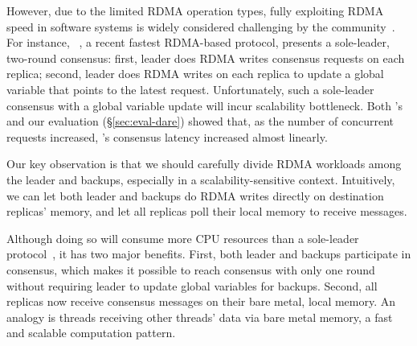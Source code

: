 However, due to the limited RDMA operation types, fully exploiting RDMA
speed in software systems is widely considered 
challenging by the community~\cite{pilaf:usenix14,herd:sigcomm14,
farm:sosp15,dare:hpdc15}. For instance, \dare~\cite{dare:hpdc15}, a recent 
fastest RDMA-based \paxos protocol, presents a sole-leader, two-round 
consensus: first, leader does RDMA writes consensus requests on each replica; 
second, leader does RDMA writes on each replica to update a global variable 
that points to the latest request. Unfortunately, such a sole-leader consensus 
with a global variable update will incur scalability bottleneck. Both \dare's 
and our evaluation (\S\ref{sec:eval-dare}) showed that, as the number of 
concurrent requests increased, \dare's consensus latency increased almost 
linearly.




Our key observation is that we should carefully divide RDMA workloads among
the leader and backups, especially in a scalability-sensitive context. 
Intuitively, we can let both leader and backups do RDMA writes directly on 
destination replicas' memory, and let all replicas poll their local memory to 
receive messages.

Although doing so will consume more CPU resources than a sole-leader 
protocol~\cite{dare:hpdc15}, it has two major benefits. First, both leader and 
backups participate in consensus, which makes it possible to reach consensus 
with only one round~\cite{paxos:practical} without requiring leader to update 
global variables for backups. Second, all replicas now receive consensus 
messages on their bare metal, local memory. An analogy is threads receiving 
other threads' data via bare metal memory, a fast and scalable computation 
pattern.


